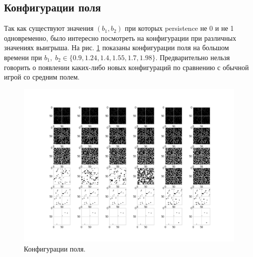 \documentclass[12pt]{article}
\begin{document}
\subsection{Конфигурации поля}
    Так как существуют значения $(b_1, b_2)$ при которых persistence не 0 и не 1 одновременно, было интересно посмотреть на конфигурации при различных значениях выигрыша. На рис. \ref{fig:Dfields} показаны конфигурации поля на большом времени при $b_1,\;b_2\in\{0.9, 1.24, 1.4, 1.55, 1.7, 1.98\}$. Предварительно нельзя говорить о появлении каких-либо новых конфигураций по сравнению с обычной игрой со средним полем.
    \begin{figure}[H]
         \centering
         \includegraphics[width=0.95\columnwidth, keepaspectratio=True]{DoubleField/differentconfigs.png}
         \caption{Конфигурации поля.}
         \label{fig:Dfields}
    \end{figure}
    
\end{document}
